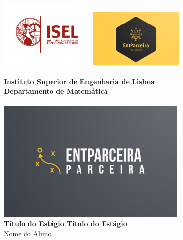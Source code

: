 {\centering
\vspace*{-3cm}
\includegraphics[width=0.35\textwidth]{logo-isel.pdf}\hfill
\includegraphics[width=0.35\textwidth]{logoEmp.png}\\
\hrulefill \\[0.5cm]
\huge
{\bf Instituto Superior de Engenharia de Lisboa\\
  Departamento de Matemática}
\\
\hfill
\\
\includegraphics[width=0.7\textwidth]{imageTrabalho.png}\\[1cm]
  {\bf Título do Estágio Título do Estágio }\\[1cm]
{\huge Nome do Aluno}\\[1cm]
}
